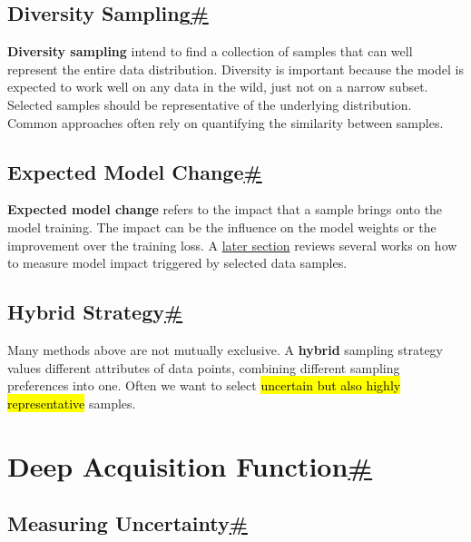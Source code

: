 \subsection{\texorpdfstring{Diversity Sampling\hyperref[diversity-sampling]{\#}}{Diversity Sampling\#}}\label{diversity-sampling}

\textbf{Diversity sampling} intend to find a collection of samples that can well represent the entire data distribution. Diversity is important because the model is expected to work well on any data in the wild, just not on a narrow subset. Selected samples should be representative of the underlying distribution. Common approaches often rely on quantifying the similarity between samples.

\subsection{\texorpdfstring{Expected Model Change\hyperref[expected-model-change]{\#}}{Expected Model Change\#}}\label{expected-model-change}

\textbf{Expected model change} refers to the impact that a sample brings onto the model training. The impact can be the influence on the model weights or the improvement over the training loss. A \hyperref[measuring-training-effects]{later section} reviews several works on how to measure model impact triggered by selected data samples.

\subsection{\texorpdfstring{Hybrid Strategy\hyperref[hybrid-strategy]{\#}}{Hybrid Strategy\#}}\label{hybrid-strategy}

Many methods above are not mutually exclusive. A \textbf{hybrid} sampling strategy values different attributes of data points, combining different sampling preferences into one. Often we want to select \hl{uncertain but also highly representative} samples.

\section{\texorpdfstring{Deep Acquisition Function\hyperref[deep-acquisition-function]{\#}}{Deep Acquisition Function\#}}\label{deep-acquisition-function}

\subsection{\texorpdfstring{Measuring Uncertainty\hyperref[measuring-uncertainty]{\#}}{Measuring Uncertainty\#}}\label{measuring-uncertainty}

